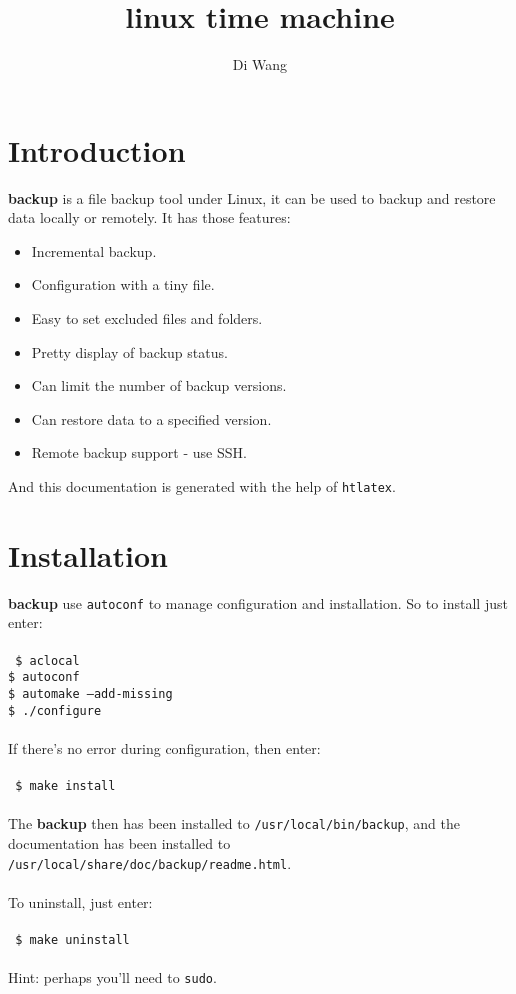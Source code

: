 \documentclass[a4paper]{article}
\author{Di Wang}
\begin{document}
\title{linux time machine}
\maketitle

\tableofcontents

\section{Introduction}
\textbf{backup} is a file backup tool under Linux, it can be used to backup and restore data locally or remotely. It has those features:
\begin{itemize}
    \item Incremental backup.
    \item Configuration with a tiny file.
    \item Easy to set excluded files and folders.
    \item Pretty display of backup status.
    \item Can limit the number of backup versions.
    \item Can restore data to a specified version.
    \item Remote backup support - use SSH.
\end{itemize}
And this documentation is generated with the help of {\large\tt htlatex}.

\section{Installation}
\textbf{backup} use {\large\tt autoconf} to manage configuration and installation. So to install just enter:\\
\\
{\tt
    \$ aclocal \\
    \$ autoconf \\
    \$ automake --add-missing \\
    \$ ./configure \\
}
\\
If there's no error during configuration, then enter:\\
\\
{\tt
    \$ make install \\
}
\\
The \textbf{backup} then has been installed to {\large\tt /usr/local/bin/backup}, and the documentation has been installed to {\large\tt /usr/local/share/doc/backup/readme.html}. \\
\\
To uninstall, just enter: \\
\\
{\tt
    \$ make uninstall \\
}
\\
Hint: perhaps you'll need to {\large\tt sudo}.
\end{document}
